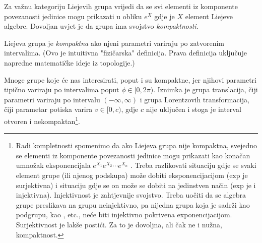 Za važnu kategoriju Liejevih grupa vrijedi da se svi elementi iz 
komponente povezanosti jedinice mogu prikazati u obliku
$e^{X}$ gdje je $X$ element
Liejeve algebre. Dovoljan uvjet je da grupa ima svojstvo \emph{kompaktnosti}.
\begin{definicija}[Kompaktnost]
Liejeva grupa je \emph{kompaktna} ako njeni parametri variraju po zatvorenim intervalima.
(Ovo je intuitivna "fizičarska" definicija. Prava definicija uključuje napredne
matematičke ideje iz topologije.)
\label{def:kompaktnost}
\end{definicija}
Mnoge grupe koje će nas interesirati, poput
 i  su kompaktne, jer njihovi parametri tipično variraju
po intervalima poput $\phi \in [0, 2\pi)$. Iznimka je
grupa translacija, čiji parametri variraju po intervalu $(-\infty,
\infty)$ i grupa Lorentzovih transformacija, čiji parametar
potiska varira $v \in [0, c)$, gdje $c$ nije uključen i stoga
je interval otvoren i nekompaktan\footnote{Radi
    kompletnosti spomenimo da ako Liejeva grupa nije kompaktna, 
    svejedno se elementi iz komponente
povezanosti jedinice mogu prikazati kao konačan umnožak eksponencijala
$e^{X_1} e^{X_2}\cdots e^{X_n}$ \cite{Stilwell:2008}.
Treba razlikovati situaciju gdje se svaki element
grupe (ili njenog podskupa) može dobiti eksponencijacijom (exp
je surjektivna) i situaciju gdje se on može se dobiti na jedinstven način 
(exp je i injektivna).
Injektivnost je zahtjevnije svojstvo. 
Treba uočiti da se algebra grupe  preslikava na grupu neinjektivno,
pa nijedna grupa koja
je sadrži kao podgrupu, kao ,  etc., neće biti injektivno pokrivena
exponencijacijom. Surjektivnost je lakše postići.
Za to je dovoljna, ali čak ne i nužna, kompaktnost.}.


